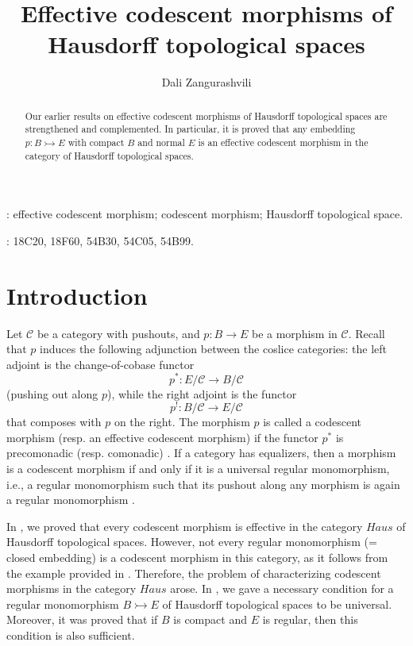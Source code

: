 \documentclass[12pt,reqno,intlim]{amsart}
\numberwithin{equation}{section}
\theoremstyle{definition}
\theoremstyle{remark}
\begin{document}
\title[]
{Effective codescent morphisms of Hausdorff topological spaces}

\author{Dali Zangurashvili}

\maketitle

\begin{abstract}
Our earlier results on effective codescent morphisms of Hausdorff topological spaces are strengthened and complemented. In particular, it is proved that any embedding $p:B\rightarrowtail E$ with compact $B$ and normal $E$ is an effective codescent morphism in the category of Hausdorff topological spaces.  
\end{abstract}
\bigskip

: effective codescent morphism; codescent morphism; Hausdorff topological space.


: 18C20, 18F60, 54B30, 54C05, 54B99.

\section{Introduction}

Let $\mathcal{C}$ be a category with pushouts, and $p: B\rightarrow E$ be a morphism in $\mathcal{C}$. Recall that $p$ induces the following adjunction between the coslice categories: the left adjoint is the change-of-cobase functor $$p^{*}: E/\mathcal{C}\rightarrow B/\mathcal{C}$$ (pushing out along $p$), while the right adjoint is the functor $$p^{!}: B/\mathcal{C}\rightarrow E/\mathcal{C}$$ that composes with $p$ on the right. The morphism $p$ is called a codescent morphism (resp. an effective codescent morphism) if the functor $p^{*}$ is precomonadic (resp. comonadic) \cite{JT}. If a category has equalizers, then a morphism is a codescent morphism if and only if it is a universal regular monomorphism, i.e., a regular monomorphism such that its pushout along any morphism is again a regular monomorphism \cite{JT1}. 

In \cite{Z2}, we proved that every codescent morphism is effective in the category $Haus$ of Hausdorff topological spaces. However, not every regular monomorphism (= closed embedding) is a codescent morphism in this category, as it follows from the example provided in \cite[Remark 5.15]{K}. Therefore, the problem of characterizing codescent morphisms in the category $Haus$ arose. In \cite{Z2}, we gave a necessary condition for a regular monomorphism  $B\rightarrowtail E$ of Hausdorff topological spaces to be universal. Moreover, it was proved that if $B$ is compact and $E$ is regular, then this condition is also sufficient.
\end{document}
